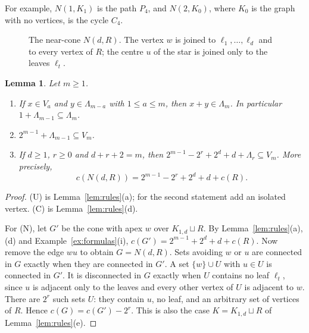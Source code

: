 \documentclass[11pt]{amsart}
\newtheorem{lemma}[theorem]{Lemma}
\theoremstyle{definition}
\theoremstyle{remark}
\newcommand{\Lam}{\Lambda}
\begin{document}
For example, $N(1,K_1)$ is the path $P_4$, and $N(2,K_0)$, where $K_0$ is the graph with no vertices, is the cycle $C_4$.

\begin{figure}[ht]
\centering
{}
\caption{The near-cone $N(d,R)$. The vertex $w$ is joined to $\ell_1,\dots,\ell_d$ and to every vertex of $R$; the centre $u$ of the star is joined only to the leaves $\ell_t$.}
\label{fig:nearcone}
\end{figure}

\begin{lemma}\label{lem:threerules}
Let $m\ge1$.
\begin{enumerate}
\item[\textup{(U)}] If $x\in V_a$ and $y\in\Lam_{m-a}$ with $1\le a\le m$, then $x+y\in\Lam_m$. In particular $1+\Lam_{m-1}\subseteq\Lam_m$.
\item[\textup{(C)}] $2^{m-1}+\Lam_{m-1}\subseteq V_m$.
\item[\textup{(N)}] If $d\ge1$, $r\ge0$ and $d+r+2=m$, then $2^{m-1}-2^r+2^d+d+\Lam_r\subseteq V_m$. More precisely,
\[
c(N(d,R))=2^{m-1}-2^r+2^d+d+c(R).
\]
\end{enumerate}
\end{lemma}

\begin{proof}
(U) is Lemma~\ref{lem:rules}(a); for the second statement add an isolated vertex. (C) is Lemma~\ref{lem:rules}(d).

For (N), let $G'$ be the cone with apex $w$ over $K_{1,d}\sqcup R$. By Lemma~\ref{lem:rules}(a),(d) and Example~\ref{ex:formulas}(i), $c(G')=2^{m-1}+2^d+d+c(R)$. Now remove the edge $wu$ to obtain $G=N(d,R)$. Sets avoiding $w$ or $u$ are connected in $G$ exactly when they are connected in $G'$. A set $\{w\}\cup U$ with $u\in U$ is connected in $G'$. It is disconnected in $G$ exactly when $U$ contains no leaf $\ell_t$, since $u$ is adjacent only to the leaves and every other vertex of $U$ is adjacent to $w$. There are $2^r$ such sets $U$: they contain $u$, no leaf, and an arbitrary set of vertices of $R$. Hence $c(G)=c(G')-2^r$. This is also the case $K=K_{1,d}\sqcup R$ of Lemma~\ref{lem:rules}(e).
\end{proof}
\end{document}
